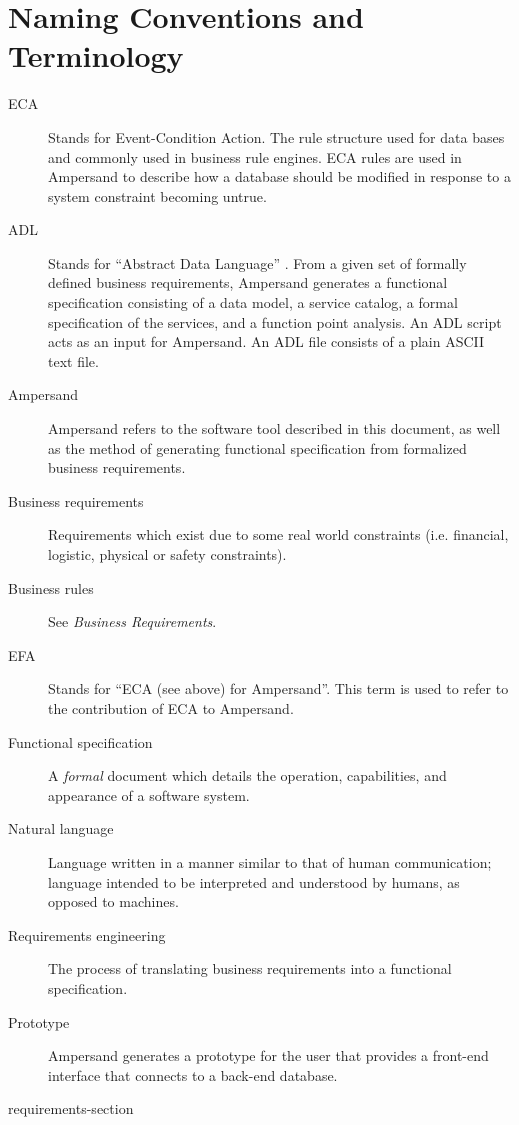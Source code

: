 \documentclass[journal,12pt,onecolumn,draftclsnofoot]{report}
\begin{document}
\section{Naming Conventions and Terminology}\label{sec:Naming} 
\begin{description}
    \item[ECA] Stands for Event-Condition Action. The rule structure used for 
    data
    bases and commonly used in  business rule engines. ECA rules are
    used in Ampersand to describe how a database should be modified in response 
    to
    a system constraint becoming untrue. 
    
    \item [ADL] Stands for ``Abstract Data Language''
      \cite[13]{derFun}.
    From a given set of formally defined business requirements, Ampersand generates a
    functional specification consisting of a data model, a service catalog, a
    formal specification of the services, and a function point analysis. An ADL
    script acts as an input for Ampersand. An ADL file consists of a plain ASCII
    text file.
    
    \item [Ampersand] Ampersand refers to the software tool described in this 
    document, as well as the method of generating functional specification from formalized
    business requirements. 
    
    \item [Business requirements] Requirements which exist due to some real 
    world 
    constraints (i.e. financial, logistic, physical or safety constraints). 
    
    \item [Business rules] See \emph{Business Requirements}.
    
    \item [EFA] Stands for ``ECA (see above) for Ampersand''. This term is used 
    to refer to the contribution of ECA to Ampersand. 
    
    \item [Functional specification] A \emph{formal} document which details the 
    operation,
    capabilities, and appearance of a software system. 
    
    \item [Natural language] Language written in a manner similar to that of 
    human 
    communication; language intended to be interpreted and understood by 
    humans, as 
    opposed to machines. 
    
    \item [Requirements engineering] The process of translating business
    requirements into a functional specification. 
    
    \item [Prototype] Ampersand generates a prototype for the user that 
    provides a 
    front-end interface that connects to a back-end database.
    
\end{description}

 {requirements-section}
\end{document}
